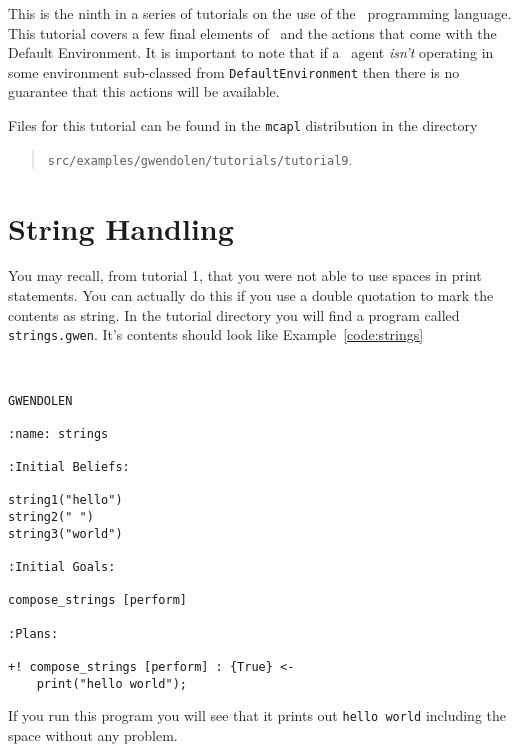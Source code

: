 
This is the ninth in a series of tutorials on the use of the \gwendolen\ programming language.  This tutorial covers a few final elements of \gwendolen\ and the actions that come with the Default Environment.  It is important to note that if a \gwendolen\ agent \emph{isn't} operating in some environment sub-classed from \texttt{DefaultEnvironment} then there is no guarantee that this actions will be available.

Files for this tutorial can be found in the \texttt{mcapl} distribution in the directory 
\begin{quote}
\texttt{src/examples/gwendolen/tutorials/tutorial9}.
\end{quote}

\section{String Handling}

You may recall, from tutorial 1, that you were not able to use spaces in print statements.  You can actually do this if you use a double quotation to mark the contents as  string.  In the tutorial directory you will find a program called \texttt{strings.gwen}.  It's contents should look like Example~\ref{code:strings}
\begin{ourexample}
\label{code:strings} \quad \\
\begin{lstlisting}[basicstyle=\sffamily,style=easslisting,language=Gwendolen]
GWENDOLEN

:name: strings

:Initial Beliefs:

string1("hello")
string2(" ")
string3("world")

:Initial Goals:

compose_strings [perform]

:Plans:

+! compose_strings [perform] : {True} <-
	print("hello world");
\end{lstlisting}
\end{ourexample}
If you run this program you will see that it prints out \texttt{hello world} including the space without any problem.

